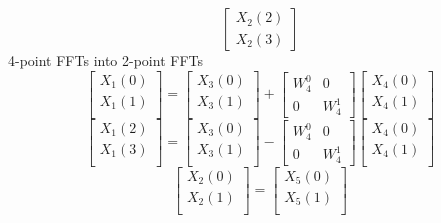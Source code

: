 \documentclass[journal,12pt,twocolumn]{IEEEtran}
\renewcommand\thesection{\arabic{section}}
\begin{document}
\begin{enumerate}[label=\arabic*.,ref=\thesection.\theenumi]
\begin{equation}
\begin{bmatrix}
		X_{2}(2) \\
		X_{2}(3)
	\end{bmatrix}
\end{equation}
4-point FFTs into 2-point FFTs
\begin{equation}
	\begin{bmatrix}
		X_{1}(0) \\ 
		X_{1}(1)\\ 
	\end{bmatrix}
	=
	\begin{bmatrix}
		X_{3}(0) \\ 
		X_{3}(1)\\ 
	\end{bmatrix}
	+
	\begin{bmatrix}
		W^{0}_{4} & 0\\
		0 & W^{1}_{4}
	\end{bmatrix}
	\begin{bmatrix}
		X_{4}(0) \\ 
		X_{4}(1) \\ 
	\end{bmatrix}
\end{equation}
\begin{equation}
	\begin{bmatrix}
		X_{1}(2) \\ 
		X_{1}(3)\\ 
	\end{bmatrix}
	=
	\begin{bmatrix}
		X_{3}(0) \\ 
		X_{3}(1)\\ 
	\end{bmatrix}
	-
	\begin{bmatrix}
		W^{0}_{4} & 0\\
		0 & W^{1}_{4}
	\end{bmatrix}
	\begin{bmatrix}
		X_{4}(0) \\ 
		X_{4}(1) \\ 
	\end{bmatrix}
\end{equation}
\begin{equation}
	\begin{bmatrix}
		X_{2}(0) \\ 
		X_{2}(1)\\ 
	\end{bmatrix}
	=
	\begin{bmatrix}
		X_{5}(0) \\ 
		X_{5}(1)\\ 
	\end{bmatrix}

\end{equation}
\end{enumerate}
\end{document}
